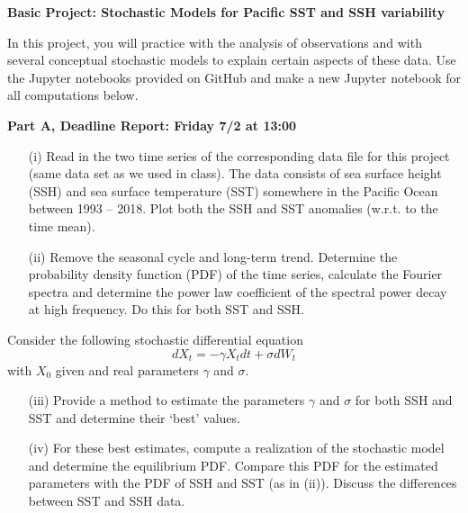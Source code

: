 \documentclass[11pt, oneside]{article}   	%
\begin{document}


\centerline{{\bf Basic Project: Stochastic Models for Pacific SST and SSH variability}} 
\vspace{1cm} 

In this project, you will practice with the analysis of observations   and with several 
conceptual stochastic models to explain certain aspects of these data.  Use the Jupyter
notebooks provided on GitHub and make a new Jupyter  notebook for all computations 
below.

\centerline{{\bf Part A, Deadline Report: Friday 7/2 at 13:00}}  

\begin{itemize}
\item[(i)] Read in the two time series of the corresponding data file for this project
(same data set as we used in class). 
The data consists of sea surface height (SSH) and sea surface temperature (SST) 
somewhere in the  Pacific Ocean between 1993 -- 2018.   Plot both the SSH and SST 
anomalies (w.r.t. to the time mean). 

\item[(ii)] Remove the seasonal cycle and long-term trend.   Determine the probability 
density function (PDF) of the time series,  calculate the Fourier spectra and determine 
the power law coefficient of the spectral power decay at high frequency.  Do this for 
both SST and SSH. 

\end{itemize}

\noindent Consider the following stochastic differential equation 
%
\[
dX_t = -\gamma X_t dt + \sigma dW_t 
\]
%
with $X_0$ given and real parameters $\gamma$ and $\sigma$. 

\begin{itemize}

\item[(iii)] Provide a method to estimate the parameters $\gamma$ 
and  $\sigma$  for  both  SSH and SST and  determine their `best' 
values.    

\item[(iv)] For these best estimates, compute a  realization 
of the stochastic model and determine the equilibrium PDF. Compare this 
PDF for the estimated parameters  with the PDF of SSH and 
SST (as in (ii)). Discuss the differences between SST and SSH 
data. 

\end{itemize} 
\end{document}

